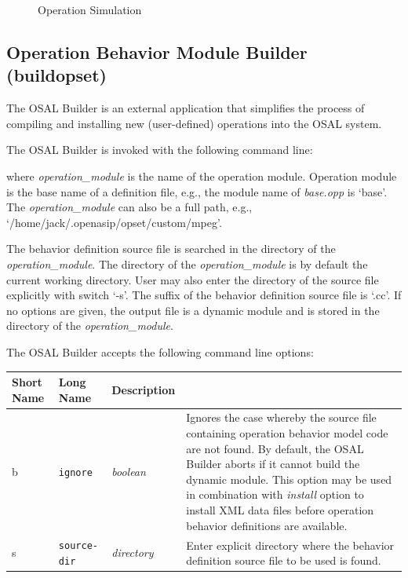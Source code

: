 \documentclass[a4paper,twoside]{tceusermanual}
\begin{document}
\begin{figure}[tb]
\centerline{}
\caption{Operation Simulation}
\label{fig:osed_simulate_dialog}
\end{figure}

\subsection{Operation Behavior Module Builder (buildopset)}
\label{sec:buildopset}

The OSAL Builder is an external application that simplifies the process of
compiling and installing new (user-defined) operations into the OSAL system.

The OSAL Builder is invoked with the following command line:


where \emph{operation\_module} is the name of the operation module. 
Operation module is the base name of a definition file, e.g., the module
name of \emph{base.opp} is `base'. The \emph{operation\_module} can also be
a full path, e.g., `/home/jack/.openasip/opset/custom/mpeg'.

The behavior definition source file is searched in the directory of the
\emph{operation\_module}. The directory of the \emph{operation\_module} is
by 
default the current working directory. User may also enter the directory of
the source file explicitly with switch `-s'. The suffix of the
behavior definition source file is `.cc'.
%
If no options are given, the output file is a dynamic module and is stored
in the directory of the \emph{operation\_module}.  

The OSAL Builder accepts the following command line options:

\begin{center}
\begin{longtable}[htb]{@{}p{}@{}p{}@{}p{}%
                     @{}p{}}

\textbf{Short Name} &\textbf{Long Name} &\textbf{Description} \\
\hline

b & \verb|ignore|         & \emph{boolean} &

Ignores the case whereby the source file containing operation behavior model
code are not found.  By default, the OSAL Builder aborts if it cannot build
the dynamic module.  This option may be used in combination with
\emph{install} option to install XML data files before operation behavior
definitions are available.\\

s & \verb|source-dir|         & \emph{directory} &

Enter explicit directory where the behavior definition source file to
be used is found.

\end{longtable}
\end{center}
\end{document}
